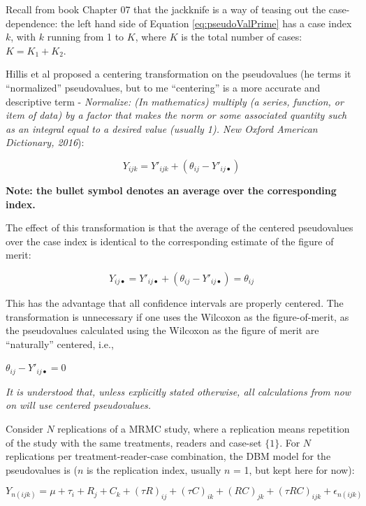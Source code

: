 \documentclass[
]{book}
\begin{document}
Recall from book Chapter 07 that the jackknife is a way of teasing out the case-dependence: the left hand side of Equation \eqref{eq:pseudoValPrime} has a case index \(k\), with \(k\) running from 1 to \(K\), where \(K\) is the total number of cases: \(K=K_1+K_2\).

Hillis et al \citep{RN1866} proposed a centering transformation on the pseudovalues (he terms it ``normalized'' pseudovalues, but to me ``centering'' is a more accurate and descriptive term - \emph{Normalize: (In mathematics) multiply (a series, function, or item of data) by a factor that makes the norm or some associated quantity such as an integral equal to a desired value (usually 1). New Oxford American Dictionary, 2016}):

\begin{equation}
Y_{ijk}=Y'_{ijk}+\left (\theta_{ij} - Y'_{ij\bullet}  \right )
\label{eq:pValCentered}
\end{equation}

\textbf{Note: the bullet symbol denotes an average over the corresponding index.}

The effect of this transformation is that the average of the centered pseudovalues over the case index is identical to the corresponding estimate of the figure of merit:

\begin{equation}
Y_{ij\bullet}=Y'_{ij\bullet}+\left (\theta_{ij} - Y'_{ij\bullet}  \right )=\theta_{ij}
\label{eq:EffectOfCentering}
\end{equation}

This has the advantage that all confidence intervals are properly centered. The transformation is unnecessary if one uses the Wilcoxon as the figure-of-merit, as the pseudovalues calculated using the Wilcoxon as the figure of merit are ``naturally'' centered, i.e.,

\(\theta_{ij} - Y'_{ij\bullet} = 0\)

\emph{It is understood that, unless explicitly stated otherwise, all calculations from now on will use centered pseudovalues.}

Consider \(N\) replications of a MRMC study, where a replication means repetition of the study with the same treatments, readers and case-set \(\{1\}\). For \(N\) replications per treatment-reader-case combination, the DBM model for the pseudovalues is (\(n\) is the replication index, usually \(n\) = 1, but kept here for now):

\begin{equation}
Y_{n(ijk)}  = \mu + \tau_i+ R_j + C_k + (\tau R)_{ij}+ (\tau C)_{ik}+ (R C)_{jk} + (\tau RC)_{ijk}+ \epsilon_{n(ijk)} 
\label{eq:DefDBMModel}
\end{equation}
\end{document}
